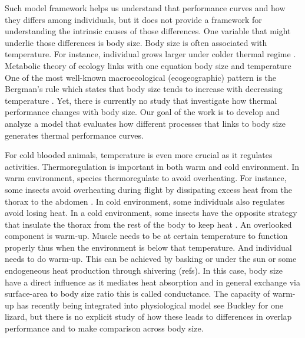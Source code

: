 Such model framework helps us understand that performance curves and how they differs  among individuals, but it does not provide a framework for understanding the intrinsic causes of those differences.
One variable that might underlie those differences is body size.
Body size is often associated with temperature.  
For instance, individual grows larger under colder thermal regime \citep{Van1996}.
Metabolic theory of ecology links with one equation body size and temperature \citep{Brown2004}
One of the most well-known macroecological (ecogeographic) pattern is the Bergman's rule which states that body size tends to increase with decreasing temperature \citep{Bergman1847}. 
Yet, there is currently no study that investigate how thermal performance changes with body size.
Our goal of the work is to develop and analyze a model that evaluates how different processes that links to body size generates thermal performance curves.

For cold blooded animals, temperature is even more crucial as it regulates activities.
Thermoregulation is important in both warm and cold environment.
In warm environment, species thermoregulate to avoid overheating.
For instance, some insects avoid overheating during flight by dissipating excess heat from the thorax to the abdomen \citep{Verdu2012}.
In cold environment, some individuals also regulates avoid losing heat.
In a cold environment, some insects have the opposite strategy that insulate the thorax from the rest of the body to keep heat \citep{Verdu2012}.
An overlooked component is warm-up.
Muscle needs to be at certain temperature to function properly thus when the environment is below that temperature.
And individual needs to do warm-up. 
This can be achieved by basking or under the sun or some endogeneous heat production through shivering (refs).
In this case, body size have a direct influence as it mediates heat absorption and in general exchange via surface-area to body size ratio this is called conductance.
The capacity of warm-up has recently being integrated into physiological model see Buckley for one lizard,  but there is no explicit study of how these leads to differences in overlap performance and to make comparison across body size. 


